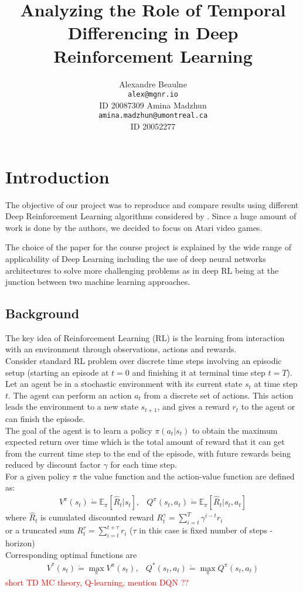 \documentclass{article}
\title{Analyzing the Role of Temporal Differencing in Deep Reinforcement Learning}
\author{
  Alexandre Beaulne \\
  \texttt{alex@mgnr.io} \\
  ID 20087309
  \And
  Amina Madzhun \\
  \texttt{amina.madzhun@umontreal.ca} \\
  ID 20052277
}
\def\defeq{\dot=}
\begin{document}
\maketitle
\section{Introduction}
	The objective of our project was to reproduce and compare results 
    using different Deep Reinforcement Learning algorithms considered 
    by \citet{amiranashvili2018analyzing}. Since a huge amount of work is 
    done by the authors, we decided to focus on Atari
    video games.
    
    The choice of the paper for the course project is explained 
    by the wide range of applicability of Deep Learning
    including the use of deep neural networks architectures
    to solve more challenging problems as in deep RL 
    being at the junction between two machine learning approaches.
    
\subsection*{Background}
	The key idea of Reinforcement Learning (RL) is the learning
    from interaction with an environment through observations,
    actions and rewards. \\
    Consider standard RL problem over discrete time steps
    involving an episodic setup (starting an episode at $t=0$ and finishing it at
    terminal time step $t=T$).
    Let an agent be in a stochastic environment 
    with its current state $s_t$ at time step $t$.
    The agent can perform
    an action $a_t$ from a discrete set of actions.
    This action leads the environment to a new state $s_{t + 1}$, 
    and gives a reward $r_t$ to the agent or can finish the episode. \\
    The goal of the agent is to learn a policy $\pi(a_t|s_t)$
    to obtain the maximum expected return over time which is
    the total amount
    of reward that it can get from the current time step 
    to the end of the episode,
    with future rewards being reduced by discount factor $\gamma$ 
    for each time step. \\
    For a given policy $\pi$ the value function and the action-value function
    are defined as:
	\begin{eqnarray*}
    	V^\pi(s_t) \defeq \mathbb{E}_{\pi} [\hat{R}_t | s_t], &
        Q^\pi(s_t, a_t) \defeq \mathbb{E}_{\pi} [\hat{R}_t | s_t, a_t] 
	\end{eqnarray*}
    where $\hat{R}_t$ is cumulated discounted reward 
    $R^\gamma_t = \sum_{i=t}^T \gamma^{i-t} r_i$ \\
    or a truncated sum $R^\tau_t = \sum_{i=t}^{t+\tau} r_i$ 
    ($\tau$ in this case is fixed number of steps - horizon)
    \\
    Corresponding optimal functions are
    \begin{eqnarray*}
    	V^*(s_t) \defeq \max_{\pi}V^\pi(s_t), &
        Q^*(s_t, a_t) \defeq \max_{\pi} Q^\pi(s_t, a_t) 
	\end{eqnarray*}
    \textcolor{red}{short TD MC theory, Q-learning, mention DQN ??} 
    
\end{document}
